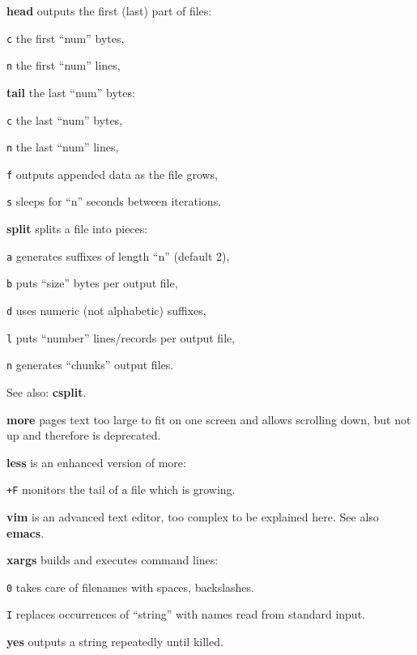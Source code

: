 \begin{compactenum}
	\item [\cmdcore] \textbf{head} outputs the first (last) part of files:
	\item [\texttt{c}] the first ``num'' bytes,
	\item [\texttt{n}] the first ``num'' lines,
	\item [\cmdcore] \textbf{tail} the last ``num'' bytes:
	\item [\texttt{c}] the last ``num'' bytes,
	\item [\texttt{n}] the last ``num'' lines,
	\item [\texttt{f}] outputs appended data as the file grows,
	\item [\texttt{s}] sleeps for ``n'' seconds between iterations. 
	\item [\cmdcore] \textbf{split} splits a file into pieces:
	\item [\texttt{a}] generates suffixes of length ``n'' (default 2),
	\item [\texttt{b}] puts ``size'' bytes per output file,
	\item [\texttt{d}] uses numeric (not alphabetic) suffixes,
	\item [\texttt{l}] puts ``number'' lines/records per output file,
	\item [\texttt{n}] generates ``chunks'' output files.
	\item [\cmdcore] See also: \textbf{csplit}.
\end{compactenum}

\begin{compactenum}
	\item [\cmdvar] \textbf{more} pages text too large to fit on one screen and 
	allows scrolling down, but not up and therefore is deprecated.
	\item [\cmdvar] \textbf{less} is an enhanced version of more:
	\item [\texttt{+F}] monitors the tail of a file which is growing.
\end{compactenum}

\begin{compactenum}
	\item [\cmdvar] \textbf{vim} is an advanced text editor, 
	too complex to be explained here.
	See also \textbf{emacs}.
\end{compactenum}

\begin{compactenum}
	\item [\cmdvar] \textbf{xargs} builds and executes command lines:
	\item [\texttt{0}] takes care of filenames with spaces, backslashes.
	\item [\texttt{I}] replaces occurrences of ``string'' with names read from standard input.
\end{compactenum}

\begin{compactenum}
	\item [\cmdvar] \textbf{yes} outputs a string repeatedly until killed.
\end{compactenum}
